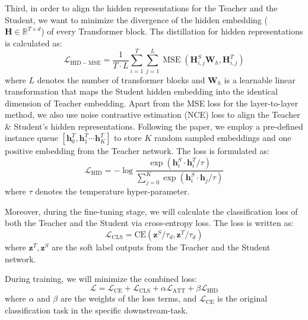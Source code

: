 \documentclass[nohyperref]{article}
\theoremstyle{plain}
\theoremstyle{definition}
\theoremstyle{remark}
\begin{document}
Third, in order to align the hidden representations for the Teacher and the Student, we want to minimize the divergence of the hidden embedding ($\mathbf{H} \in \mathbb{R}^{T \times d}$) of every Transformer block. Ths distillation for hidden representations is calculated as:
\begin{equation}
\mathcal{L}_{\mathrm{HID}-\mathrm{MSE}}=\frac{1}{T \cdot L} \sum_{i=1}^T \sum_{j=1}^L \operatorname{MSE}\left(\mathbf{H}_{i, j}^S \mathbf{W}_h, \mathbf{H}_{i, j}^T\right)
\end{equation}
where $L$ denotes the number of transformer blocks and $\mathbf{W}_h$ is a learnable linear transformation that maps the Student hidden embedding into the identical dimension of Teacher embedding. Apart from the MSE loss for the layer-to-layer method, we also use noise contrastive estimation (NCE) loss to align the Teacher \& Student’s hidden representations. Following the paper, we employ a pre-defined instance queue $\left[\mathbf{h}_0^T, \mathbf{h}_1^T \cdots \mathbf{h}_K^T\right]$ to store $K$ random sampled
embeddings and one positive embedding from the Teacher
network. The loss is formulated as:
\begin{equation}
\mathcal{L}_{\mathrm{HID}}=-\log \frac{\exp \left(\mathbf{h}_i^S \cdot \mathbf{h}_i^T / \tau\right)}{\sum_{j=0}^K \exp \left(\mathbf{h}_i^S \cdot \mathbf{h}_j / \tau\right)}
\end{equation}
where $\tau$ denotes the temperature hyper-parameter.

Moreover, during the fine-tuning stage, we will calculate the classification loss of both the Teacher and the Student via cross-entropy loss. The loss is written as:
\begin{equation}
\mathcal{L}_{\mathrm{CLS}}=\mathrm{CE}\left(\mathbf{z}^S / \tau_d, \mathbf{z}^T / \tau_d\right)
\end{equation}
where $\mathbf{z}^T, \mathbf{z}^S$ are the soft label outputs
from the Teacher and the Student network.

During training, we will minimize the combined loss:
\begin{equation}
\mathcal{L}=\mathcal{L}_{\mathrm{CE}}+\mathcal{L}_{\mathrm{CLS}}+\alpha \mathcal{L}_{\mathrm{ATT}}+\beta \mathcal{L}_{\mathrm{HID}}
\end{equation}
where $\alpha$ and $\beta$ are the weights of the loss terms, and $\mathcal{L}_{\mathrm{CE}}$ is the original classification task in the specific downstream-task.


\clearpage



\end{document}
